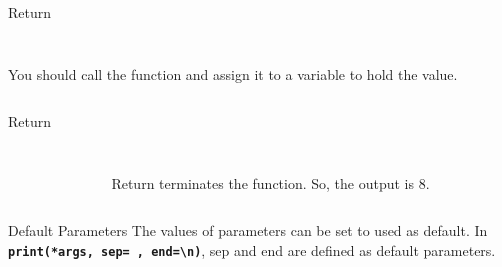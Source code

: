         \begin{frame}{Return}
            \begin{columns}
                \begin{column}{0.50\textwidth}
                    \inputminted[frame=single,framesep=2pt, lastline=15]{python3}{code-examples/return1.py}
                    You should call the function and assign it to a variable to hold the value.
                \end{column}
                \begin{column}{0.50\textwidth}
                    \inputminted[frame=single,framesep=2pt, lastline=15]{python3}{code-examples/return1_1.py}
                \end{column}
            \end{columns}
        \end{frame}

        \begin{frame}{Return}
            \begin{columns}
                \begin{column}{0.50\textwidth}
                    \inputminted[frame=single,framesep=2pt, lastline=15]{python3}{code-examples/return2.py}  
                \end{column}
                \begin{column}{0.50\textwidth}
                    \inputminted[frame=single,framesep=2pt, lastline=15]{python3}{code-examples/return3.py}
                    Return terminates the function. So, the output is 8.
                \end{column}
            \end{columns}
        \end{frame}

        \begin{frame}{Default Parameters}
            The values of parameters can be set to used as default.
            \newline
            In \textbf{\texttt{print(*args, sep=\textquotesingle \ \textquotesingle, end=\textquotesingle \textbackslash n\textquotesingle )}}, 
            sep and end are defined as default parameters.
            \inputminted[frame=single,framesep=2pt, lastline=15]{python3}{code-examples/default.py}
            \begin{columns}
                \begin{column}{0.50\textwidth}
                    \inputminted[frame=single,framesep=2pt, lastline=15]{python3}{code-examples/valid1.py}  
                \end{column}
                \begin{column}{0.50\textwidth}
                    \inputminted[frame=single,framesep=2pt, lastline=15]{python3}{code-examples/valid1_1.py}                    
                \end{column}
            \end{columns}
        \end{frame}

